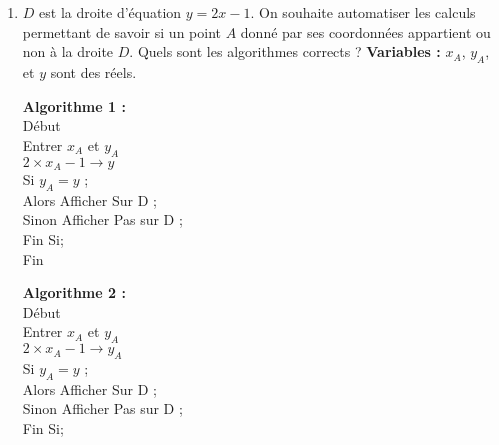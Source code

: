 \begin{exr}
  \begin{enumerate}
  \item $D$ est la droite d'équation $y =2x-1$.\newline 
  On souhaite automatiser les calculs permettant de savoir si un point $A$ donné par ses coordonnées appartient ou non à la droite $D$.\newline
  Quels sont les algorithmes corrects ?\newline
  \textbf{Variables :} $x_A$,  $y_A$,  et $y$ sont des réels.\\
  {\small
    \begin{minipage}[c]{0.31\linewidth}
    \textbf{Algorithme 1 :}	\\
    \noindent Début  \\
    \hspace*{0.5cm} Entrer $x_A$ et $y_A$\\
    \hspace*{0.5cm}  $2\times x_A -1 \rightarrow y$ \\
    \hspace*{0.5cm} Si $y_A=y$ ;\\
    \hspace*{1cm} Alors Afficher \og Sur D \fg;\\
    \hspace*{1cm} Sinon Afficher \og Pas sur D \fg;\\
    \hspace*{0.5cm} Fin Si; \\
    Fin
    \end{minipage}
  \hfill\vline\hfill
    \begin{minipage}[c]{0.31\linewidth}
    \textbf{Algorithme 2 :}	\\
    \noindent Début  \\
    \hspace*{0.5cm} Entrer $x_A$ et $y_A$\\
    \hspace*{0.5cm}  $2\times x_A -1 \rightarrow y_A$ \\
    \hspace*{0.5cm} Si $y_A=y$ ;\\
    \hspace*{1cm} Alors Afficher \og Sur D \fg;\\
    \hspace*{1cm} Sinon Afficher \og Pas sur D \fg;\\
    \hspace*{0.5cm} Fin Si; \\

\end{minipage}}
\end{enumerate}
\end{exr}
